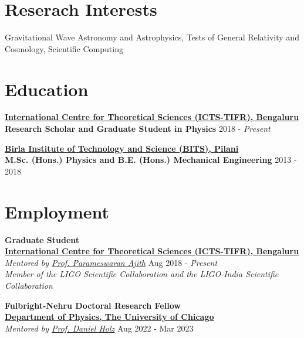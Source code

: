 \documentclass[11pt, margin, centered, letterpaper]{res}
\begin{document}
\begin{resume}

\section{Reserach Interests}
Gravitational Wave Astronomy and Astrophysics, Tests of General Relativity and Cosmology, Scientific Computing 
\\
\section{Education}
\textbf{\href{https://www.icts.res.in/}{International Centre for Theoretical Sciences (ICTS-TIFR), Bengaluru}}\\
\textbf{Research Scholar and Graduate Student in Physics} \hfill 2018 - \textit{Present}

\textbf{\href{http://www.bits-pilani.ac.in/}{Birla Institute of Technology and Science (BITS), Pilani}}\\
\textbf{M.Sc. (Hons.) Physics and B.E. (Hons.) Mechanical Engineering} \hfill 2013 - 2018

\section{Employment}
\textbf{Graduate Student}
\\
\textbf{\href{https://www.icts.res.in/}{International Centre for Theoretical Sciences (ICTS-TIFR), Bengaluru}}\\
\emph{Mentored by \href{https://home.icts.res.in/~ajith/Home.html}{Prof. Parameswaran Ajith}} \hfill Aug 2018 - \textit{Present}\\
\textit{Member of the LIGO Scientific Collaboration and the LIGO-India Scientific Collaboration}

\textbf{Fulbright-Nehru Doctoral Research Fellow}
\\
\textbf{\href{https://www.icts.res.in/}{Department of Physics, The University of Chicago}}\\
\emph{Mentored by \href{https://home.icts.res.in/~ajith/Home.html}{Prof. Daniel Holz}} \hfill Aug 2022 - Mar 2023


\end{resume}
\end{document}
